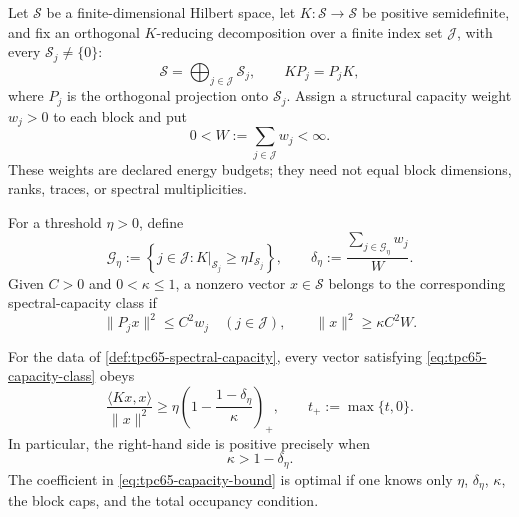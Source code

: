 \begin{definition}
\label{def:tpc65-spectral-capacity}
Let \(\mathcal S\) be a finite-dimensional Hilbert space, let
\(K\colon\mathcal S\to\mathcal S\) be positive semidefinite, and fix an
orthogonal \(K\)-reducing decomposition over a finite index set
\(\mathcal J\), with every \(\mathcal S_j\ne\{0\}\):
\begin{equation}
  \mathcal S=\bigoplus_{j\in\mathcal J}\mathcal S_j,
  \qquad
  KP_j=P_jK,
  \label{eq:tpc65-reducing-decomposition}
\end{equation}
where \(P_j\) is the orthogonal projection onto \(\mathcal S_j\).
Assign a structural capacity weight \(w_j>0\) to each block and put
\[
  0<W:=\sum_{j\in\mathcal J}w_j<\infty.
\]
These weights are declared energy budgets; they need not equal block
dimensions, ranks, traces, or spectral multiplicities.

For a threshold \(\eta>0\), define
\begin{equation}
  \mathcal G_\eta
  :=
  \left\{
    j\in\mathcal J:
    K|_{\mathcal S_j}\ge \eta I_{\mathcal S_j}
  \right\},
  \qquad
  \delta_\eta
  :=
  \frac{\sum_{j\in\mathcal G_\eta}w_j}{W}.
  \label{eq:tpc65-good-blocks}
\end{equation}
Given \(C>0\) and \(0<\kappa\le 1\), a nonzero vector
\(x\in\mathcal S\) belongs to the corresponding spectral-capacity class if
\begin{equation}
  \|P_jx\|^2\le C^2w_j
  \quad (j\in\mathcal J),
  \qquad
  \|x\|^2\ge \kappa C^2W.
  \label{eq:tpc65-capacity-class}
\end{equation}
\end{definition}

\begin{theorem}
\label{thm:tpc65-sharp-spectral-capacity}
For the data of \cref{def:tpc65-spectral-capacity}, every vector satisfying
\eqref{eq:tpc65-capacity-class} obeys
\begin{equation}
  \boxed{
  \frac{\langle Kx,x\rangle}{\|x\|^2}
  \ge
  \eta
  \left(
    1-\frac{1-\delta_\eta}{\kappa}
  \right)_+ ,
  }
  \qquad
  t_+:=\max\{t,0\}.
  \label{eq:tpc65-capacity-bound}
\end{equation}
In particular, the right-hand side is positive precisely when
\begin{equation}
  \kappa>1-\delta_\eta.
  \label{eq:tpc65-positive-threshold}
\end{equation}
The coefficient in \eqref{eq:tpc65-capacity-bound} is optimal if one knows
only \(\eta\), \(\delta_\eta\), \(\kappa\), the block caps, and the total
occupancy condition.
\end{theorem}

